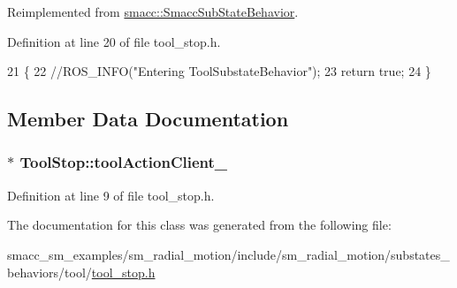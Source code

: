 Reimplemented from \hyperlink{classsmacc_1_1SmaccSubStateBehavior_ab78b9de76c04a7ab6c16d5924e216ef9}{smacc\+::\+Smacc\+Sub\+State\+Behavior}.



Definition at line 20 of file tool\+\_\+stop.\+h.


\begin{DoxyCode}
21     \{
22       \textcolor{comment}{//ROS\_INFO("Entering ToolSubstateBehavior");}
23       \textcolor{keywordflow}{return} \textcolor{keyword}{true};
24     \}
\end{DoxyCode}


\subsection{Member Data Documentation}
\subsubsection[{\texorpdfstring{tool\+Action\+Client\+\_\+}{toolActionClient_}}]{$\ast$ Tool\+Stop\+::tool\+Action\+Client\+\_\+}\hypertarget{classToolStop_ae8ebe607606d235b52317e9a0f570e31}{}\label{classToolStop_ae8ebe607606d235b52317e9a0f570e31}


Definition at line 9 of file tool\+\_\+stop.\+h.



The documentation for this class was generated from the following file\+:\begin{DoxyCompactItemize}
\item 
smacc\+\_\+sm\+\_\+examples/sm\+\_\+radial\+\_\+motion/include/sm\+\_\+radial\+\_\+motion/substates\+\_\+behaviors/tool/\hyperlink{tool__stop_8h}{tool\+\_\+stop.\+h}\end{DoxyCompactItemize}
